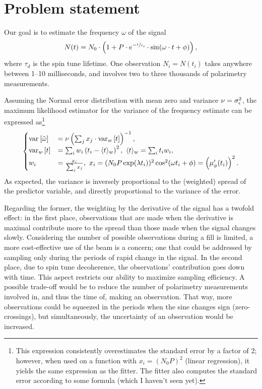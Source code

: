 \documentclass{article}
\newcommand{\obs}{\epsilon}
\begin{document}
	
\section*{Problem statement}

Our goal is to estimate the frequency $\omega$ of the signal
\begin{equation}
	N(t) = N_0\cdot\bkt{1 + P\cdot e^{-\sfrac{t}{\tau_d}}\cdot\sin(\omega\cdot t + \phi)},
\end{equation}
where $\tau_d$ is the spin tune lifetime. One observation $N_i = N(t_i)$ takes anywhere between 1--10 milliseconds, and involves two to three thousands of polarimetry measurements.

Assuming the Normal error distribution with mean zero and variance $\nu = \SD{\obs}^2$, the maximum likelihood estimator for the variance of the frequency estimate can be expressed as\footnote{This expression consistently overestimates the standard error by a factor of 2; however, when used on a function with $x_i = (N_0P)^2$ (linear regression), it yields the same expression as the fitter. The fitter also computes the standard error according to some formula (which I haven't seen yet).}
\begin{equation}
\begin{cases}
\var{\hat\omega} &= \nu\bkt{\sum_j x_j\cdot \var[w]{t}}^{-1}, \\
\var[w]{t} &= \sum_i w_i \bkt{t_i - \avg{t}_w}^2,~ \avg{t}_w = \sum_i t_i w_i, \\
w_i &= \frac{x_i}{\sum_j x_j},~ x_i = (N_0P\exp(\lambda t_i))^2\cos^2(\omega t_i + \phi) = \bkt{\mupp}^2.
\end{cases}	
\end{equation}
As expected, the variance is inversely proportional to the (weighted) spread of the predictor variable,
and directly proportional to the variance of the error. 

Regarding the former, the weighting by the derivative of the signal has a twofold effect: in the first place, observations that are made when the derivative is maximal contribute more to the spread than those made when the signal changes slowly. Considering the number of possible observations during a fill is limited, a more cost-effective use of the beam is a concern; one that could be addressed by sampling only during the periods of rapid change in the signal. In the second place, due to spin tune decoherence, the observations' contribution goes down with time. This aspect restricts our ability to maximize sampling efficiency. A possible trade-off would be to reduce the number of polarimetry measurements involved in, and thus the time of, making an observation. That way, more observations could be squeezed in the periods when the sine changes sign (zero-crossings), but simultaneously, the uncertainty of an observation would be increased. 
\end{document}
